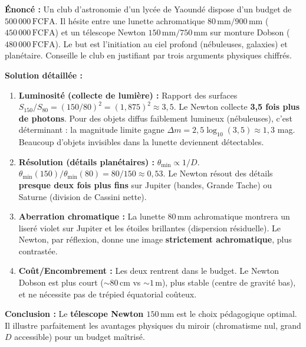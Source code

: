 \documentclass[11pt]{article}
\begin{document}
\begin{exoresolu}
\textbf{Énoncé :} Un club d'astronomie d'un lycée de Yaoundé dispose d'un budget de $500\,000\,\text{FCFA}$. Il hésite entre une lunette achromatique $80\,\text{mm}/900\,\text{mm}$ ($450\,000\,\text{FCFA}$) et un télescope Newton $150\,\text{mm}/750\,\text{mm}$ sur monture Dobson ($480\,000\,\text{FCFA}$). Le but est l'initiation au ciel profond (nébuleuses, galaxies) et planétaire. Conseille le club en justifiant par trois arguments physiques chiffrés.

\textbf{Solution détaillée :}
\begin{enumerate}
    \item \textbf{Luminosité (collecte de lumière) :} Rapport des surfaces $S_{150}/S_{80} = (150/80)^2 = (1,875)^2 \approx 3,5$. Le Newton collecte \textbf{3,5 fois plus de photons}. Pour des objets diffus faiblement lumineux (nébuleuses), c'est déterminant : la magnitude limite gagne $\Delta m = 2,5\log_{10}(3,5) \approx 1,3$ mag. Beaucoup d'objets invisibles dans la lunette deviennent détectables.
    \item \textbf{Résolution (détails planétaires) :} $\theta_{\min} \propto 1/D$. $\theta_{\min}(150)/\theta_{\min}(80) = 80/150 \approx 0,53$. Le Newton résout des détails \textbf{presque deux fois plus fins} sur Jupiter (bandes, Grande Tache) ou Saturne (division de Cassini nette).
    \item \textbf{Aberration chromatique :} La lunette $80\,\text{mm}$ achromatique montrera un liseré violet sur Jupiter et les étoiles brillantes (dispersion résiduelle). Le Newton, par réflexion, donne une image \textbf{strictement achromatique}, plus contrastée.
    \item \textbf{Coût/Encombrement :} Les deux rentrent dans le budget. Le Newton Dobson est plus court ($\sim 80\,\text{cm}$ vs $\sim 1\,\text{m}$), plus stable (centre de gravité bas), et ne nécessite pas de trépied équatorial coûteux.
\end{enumerate}
\textbf{Conclusion :} Le \textbf{télescope Newton $150\,\text{mm}$} est le choix pédagogique optimal. Il illustre parfaitement les avantages physiques du miroir (chromatisme nul, grand $D$ accessible) pour un budget maîtrisé.
\end{exoresolu}
\end{document}
